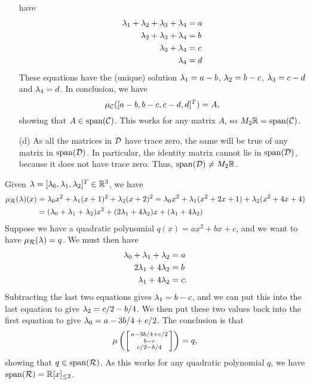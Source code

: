 \begin{itemize}
   have
   \begin{align*}
    \lambda_1 + \lambda_2 + \lambda_3 + \lambda_4 &= a \\
            \lambda_2 + \lambda_3 + \lambda_4 &= b \\
                    \lambda_3 + \lambda_4 &= c \\
                            \lambda_4 &= d
   \end{align*}
   These equations have the (unique) solution $\lambda_1=a-b$,
   $\lambda_2=b-c$, $\lambda_3=c-d$ and $\lambda_4=d$.  In conclusion,
   we have
   \[ \mu_{{\mathcal{C}}}([a-b, b-c, c-d, d]^T) = A,  \]
   showing that $A\in\operatorname{span}({\mathcal{C}})$.  This works for any matrix
   $A$, so $M_2{\mathbb{R}}=\operatorname{span}({\mathcal{C}})$.
  \item[(d)] As all the matrices in ${\mathcal{D}}$ have trace zero,
   the same will be true of any matrix in $\operatorname{span}({\mathcal{D}})$.  In
   particular, the identity matrix cannot lie in
   $\operatorname{span}({\mathcal{D}})$, because it does not have trace zero.  Thus,
   $\operatorname{span}({\mathcal{D}})\neq M_2{\mathbb{R}}$.
 \end{itemize}
\EndDeferredSolution

 Given $\mathbf{\lambda}=[\lambda_0,\lambda_1,\lambda_2]^T\in{\mathbb{R}}^3$, we have
 \begin{align*}
  \mu_{\mathcal{R}}(\mathbf{\lambda})(x)
   &= \lambda_0x^2 + \lambda_1(x+1)^2 + \lambda_2(x+2)^2
    = \lambda_0x^2 + \lambda_1(x^2+2x+1) + \lambda_2(x^2+4x+4) \\
   &= (\lambda_0+\lambda_1+\lambda_2)x^2 + (2\lambda_1+4\lambda_2)x + (\lambda_1+4\lambda_2)
 \end{align*}
 Suppose we have a quadratic polynomial $q(x)=ax^2+bx+c$,
 and we want to have $\mu_{\mathcal{R}}(\mathbf{\lambda})=q$.  We must then have
 \begin{align*}
  \lambda_0+\lambda_1+\lambda_2 &= a \\
  2\lambda_1 + 4\lambda_2 &= b \\
  \lambda_1 + 4\lambda_2 &= c.
 \end{align*}
 Subtracting the last two equations gives $\lambda_1=b-c$, and
 we can put this into the last equation to give
 $\lambda_2=c/2-b/4$.  We then put these two values back into
 the first equation to give $\lambda_0=a-3b/4+c/2$.  The
 conclusion is that
 \[ \mu\left(\left[\begin{smallmatrix} a-3b/4+c/2 \\ b-c \\ c/2-b/4\end{smallmatrix}\right]\right) = q,
 \]
 showing that $q\in\operatorname{span}({\mathcal{R}})$.  As this works for any
 quadratic polynomial $q$, we have $\operatorname{span}({\mathcal{R}})={\mathbb{R}}[x]_{\leq 2}$.
\EndDeferredSolution


